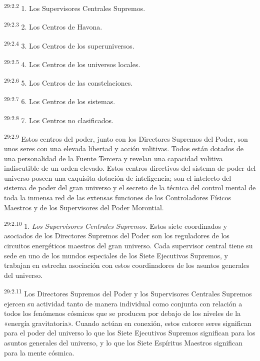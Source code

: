 \par
\textsuperscript{29:2.2} 1. Los Supervisores Centrales Supremos.

\par
\textsuperscript{29:2.3} 2. Los Centros de Havona.

\par
\textsuperscript{29:2.4} 3. Los Centros de los superuniversos.

\par
\textsuperscript{29:2.5} 4. Los Centros de los universos locales.

\par
\textsuperscript{29:2.6} 5. Los Centros de las constelaciones.

\par
\textsuperscript{29:2.7} 6. Los Centros de los sistemas.

\par
\textsuperscript{29:2.8} 7. Los Centros no clasificados.

\par
\textsuperscript{29:2.9} Estos centros del poder, junto con los Directores Supremos del Poder, son unos seres con una elevada libertad y acción volitivas. Todos están dotados de una personalidad de la Fuente Tercera y revelan una capacidad volitiva indiscutible de un orden elevado. Estos centros directivos del sistema de poder del universo poseen una exquisita dotación de inteligencia; son el intelecto del sistema de poder del gran universo y el secreto de la técnica del control mental de toda la inmensa red de las extensas funciones de los Controladores Físicos Maestros y de los Supervisores del Poder Morontial.

\par
\textsuperscript{29:2.10} 1. \textit{Los Supervisores Centrales Supremos.} Estos siete coordinados y asociados de los Directores Supremos del Poder son los reguladores de los circuitos energéticos maestros del gran universo. Cada supervisor central tiene su sede en uno de los mundos especiales de los Siete Ejecutivos Supremos, y trabajan en estrecha asociación con estos coordinadores de los asuntos generales del universo.

\par
\textsuperscript{29:2.11} Los Directores Supremos del Poder y los Supervisores Centrales Supremos ejercen su actividad tanto de manera individual como conjunta con relación a todos los fenómenos cósmicos que se producen por debajo de los niveles de la «energía gravitatoria». Cuando actúan en conexión, estos catorce seres significan para el poder del universo lo que los Siete Ejecutivos Supremos significan para los asuntos generales del universo, y lo que los Siete Espíritus Maestros significan para la mente cósmica.

